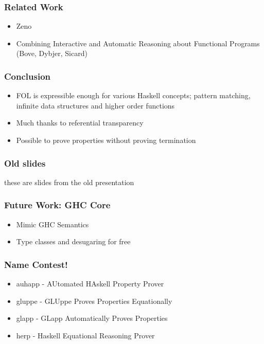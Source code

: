 \documentclass[serif,professionalfont]{beamer}
\begin{document}
\begin{frame}
  \frametitle{Related Work}
  \begin{itemize}
    \item Zeno
    \item Combining Interactive and Automatic Reasoning about Functional Programs
          (Bove, Dybjer, Sicard)
  \end{itemize}
\end{frame}

\begin{frame}
\frametitle{Conclusion}

\begin{itemize}
\item FOL is expressible enough for various Haskell concepts; pattern
  matching, infinite data structures and higher order functions
\item Much thanks to referential transparency
\item Possible to prove properties without proving termination
\end{itemize}
\end{frame}


\begin{frame}
\frametitle{Old slides}
these are slides from the old presentation
\end{frame}


\begin{frame}
\frametitle{Future Work: GHC Core}
\label{sec-9}
\begin{itemize}

\item Mimic GHC Semantics\\
\label{sec-9-1}%
\item Type classes and desugaring for free\\
\label{sec-9-2}%
\end{itemize} %
\end{frame}

\begin{frame}
\frametitle{Name Contest!}
\label{sec-11}
\begin{itemize}

\item auhapp - AUtomated HAskell Property Prover\\
\label{sec-11-1}%
\item gluppe - GLUppe Proves Properties Equationally\\
\label{sec-11-2}%
\item glapp - GLapp Automatically Proves Properties\\
\label{sec-11-3}%
\item herp - Haskell Equational Reasoning Prover\\
\label{sec-11-4}%
\end{itemize} %
\end{frame}
\end{document}
